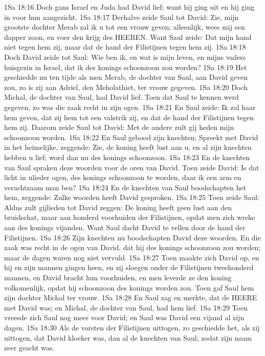1Sa 18:16  Doch gans Israel en Juda had David lief; want hij ging uit en hij ging in voor hun aangezicht.
1Sa 18:17  Derhalve zeide Saul tot David: Zie, mijn grootste dochter Merab zal ik u tot een vrouw geven; alleenlijk, wees mij een dapper zoon, en voer den krijg des HEEREN. Want Saul zeide: Dat mijn hand niet tegen hem zij, maar dat de hand der Filistijnen tegen hem zij.
1Sa 18:18  Doch David zeide tot Saul: Wie ben ik, en wat is mijn leven, en mijns vaders huisgezin in Israel, dat ik des konings schoonzoon zou worden?
1Sa 18:19  Het geschiedde nu ten tijde als men Merab, de dochter van Saul, aan David geven zou, zo is zij aan Adriel, den Meholathiet, ter vrouw gegeven.
1Sa 18:20  Doch Michal, de dochter van Saul, had David lief. Toen dat Saul te kennen werd gegeven, zo was die zaak recht in zijn ogen.
1Sa 18:21  En Saul zeide: Ik zal haar hem geven, dat zij hem tot een valstrik zij, en dat de hand der Filistijnen tegen hem zij. Daarom zeide Saul tot David: Met de andere zult gij heden mijn schoonzoon worden.
1Sa 18:22  En Saul gebood zijn knechten: Spreekt met David in het heimelijke, zeggende: Zie, de koning heeft lust aan u, en al zijn knechten hebben u lief; word dan nu des konings schoonzoon.
1Sa 18:23  En de knechten van Saul spraken deze woorden voor de oren van David. Toen zeide David: Is dat licht in ulieder ogen, des konings schoonzoon te worden, daar ik een arm en verachtzaam man ben?
1Sa 18:24  En de knechten van Saul boodschapten het hem, zeggende: Zulke woorden heeft David gesproken.
1Sa 18:25  Toen zeide Saul: Aldus zult gijlieden tot David zeggen: De koning heeft geen lust aan den bruidschat, maar aan honderd voorhuiden der Filistijnen, opdat men zich wreke aan des konings vijanden. Want Saul dacht David te vellen door de hand der Filistijnen.
1Sa 18:26  Zijn knechten nu boodschapten David deze woorden. En die zaak was recht in de ogen van David, dat hij des konings schoonzoon zou worden; maar de dagen waren nog niet vervuld.
1Sa 18:27  Toen maakte zich David op, en hij en zijn mannen gingen heen, en zij sloegen onder de Filistijnen tweehonderd mannen, en David bracht hun voorhuiden, en men leverde ze den koning volkomenlijk, opdat hij schoonzoon des konings worden zou. Toen gaf Saul hem zijn dochter Michal ter vrouw.
1Sa 18:28  En Saul zag en merkte, dat de HEERE met David was; en Michal, de dochter van Saul, had hem lief.
1Sa 18:29  Toen vreesde zich Saul nog meer voor David; en Saul was David een vijand al zijn dagen.
1Sa 18:30  Als de vorsten der Filistijnen uittogen, zo geschiedde het, als zij uittogen, dat David kloeker was, dan al de knechten van Saul; zodat zijn naam zeer geacht was.
